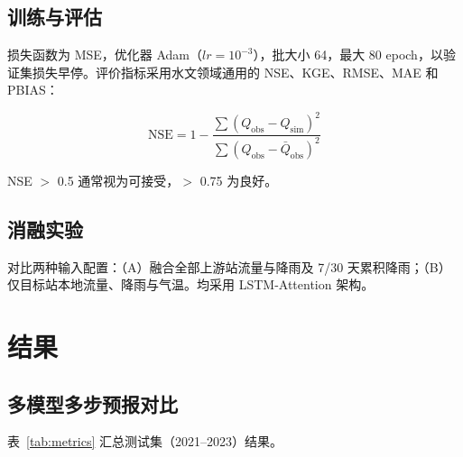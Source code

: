 \documentclass[12pt,a4paper]{article}
\begin{document}
\subsection{训练与评估}

损失函数为 MSE，优化器 Adam（$lr=10^{-3}$），批大小 64，最大 80 epoch，以验证集损失早停。评价指标采用水文领域通用的 NSE、KGE、RMSE、MAE 和 PBIAS\cite{nash1970,gupta2009}：

\begin{equation}
  \text{NSE} = 1 - \frac{\sum(Q_{\text{obs}}-Q_{\text{sim}})^2}{\sum(Q_{\text{obs}}-\bar{Q}_{\text{obs}})^2}
\end{equation}

NSE $>$ 0.5 通常视为可接受，$>$ 0.75 为良好\cite{moriasi2007}。

\subsection{消融实验}

对比两种输入配置：（A）融合全部上游站流量与降雨及 7/30 天累积降雨；（B）仅目标站本地流量、降雨与气温。均采用 LSTM-Attention 架构。

\section{结果}

\subsection{多模型多步预报对比}

表~\ref{tab:metrics} 汇总测试集（2021--2023）结果。
\end{document}
